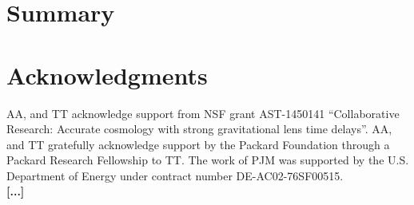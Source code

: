 \documentclass[a4paper,11pt]{article}
\begin{document}
{\section{Summary}

\section*{Acknowledgments}

AA, and TT acknowledge support from NSF grant AST-1450141 ``Collaborative
Research: Accurate cosmology with strong gravitational lens time
delays''. AA, and TT gratefully acknowledge support by the
Packard Foundation through a Packard Research Fellowship to TT.
The work of PJM was supported by the U.S.  Department of Energy under
contract number DE-AC02-76SF00515.\\
\textbf{[...]}








}
\end{document}
